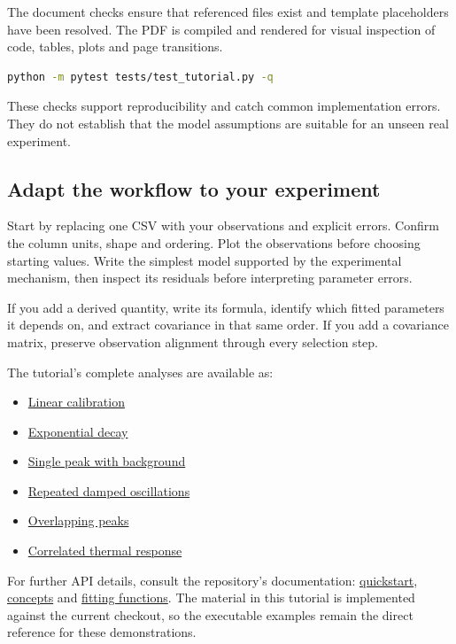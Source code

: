 \documentclass[
  british,
  10pt,
  a4paper,
]{article}
\providecommand{\tightlist}{%
  \setlength{\itemsep}{0pt}\setlength{\parskip}{0pt}}
\begin{document}
The document checks ensure that referenced files exist and template
placeholders have been resolved. The PDF is compiled and rendered for
visual inspection of code, tables, plots and page transitions.

\par\noindent\begin{minipage}{\linewidth}

\begin{lstlisting}[language=sh]
python -m pytest tests/test_tutorial.py -q
\end{lstlisting}

\end{minipage}\par

These checks support reproducibility and catch common implementation
errors. They do not establish that the model assumptions are suitable
for an unseen real experiment.


\subsection{Adapt the workflow to your
experiment}\label{adapt-the-workflow-to-your-experiment}

Start by replacing one CSV with your observations and explicit errors.
Confirm the column units, shape and ordering. Plot the observations
before choosing starting values. Write the simplest model supported by
the experimental mechanism, then inspect its residuals before
interpreting parameter errors.

If you add a derived quantity, write its formula, identify which fitted
parameters it depends on, and extract covariance in that same order. If
you add a covariance matrix, preserve observation alignment through
every selection step.

The tutorial's complete analyses are available as:

\begin{itemize}
\tightlist
\item
  \href{example_01_calibration.py}{Linear calibration}
\item
  \href{example_02_decay.py}{Exponential decay}
\item
  \href{example_03_single_peak.py}{Single peak with background}
\item
  \href{example_04_oscillators.py}{Repeated damped oscillations}
\item
  \href{example_05_double_peak.py}{Overlapping peaks}
\item
  \href{example_06_correlated.py}{Correlated thermal response}
\end{itemize}

For further API details, consult the repository's documentation:
\href{../../docs/quickstart.rst}{quickstart},
\href{../../docs/concepts.rst}{concepts} and
\href{../../docs/fitting-functions.rst}{fitting functions}. The material
in this tutorial is implemented against the current checkout, so the
executable examples remain the direct reference for these
demonstrations.
\end{document}
